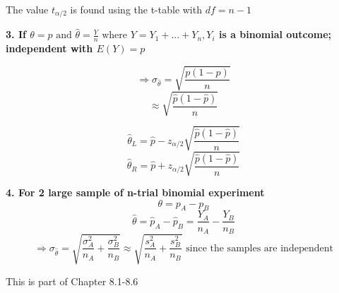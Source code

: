 \documentclass[12pt, letterpaper]{article}
\begin{document}
The value $t_{\alpha/2}$ is found using the t-table with $df=n-1$\bigskip

\textbf{3. If $\theta=p \text{ and } \hat{\theta}=\frac{Y}{n} \text{ where } Y=Y_1+...+Y_n, Y_i$ is a binomial outcome; independent with $E(Y)=p$}

$$\Rightarrow\sigma_{\hat{\theta}} = \sqrt{\frac{p(1-p)}{n}}$$
$$\approx\sqrt{\frac{\hat{p}(1-\hat{p})}{n}}$$

$$\hat{\theta}_L=\hat{p}-z_{\alpha/2}\sqrt{\frac{\hat{p}(1-\hat{p})}{n}}$$
$$\hat{\theta}_R=\hat{p}+z_{\alpha/2}\sqrt{\frac{\hat{p}(1-\hat{p})}{n}}$$

\textbf{4. For 2 large sample of n-trial binomial experiment}
$$\theta=p_A-p_B$$
$$\hat{\theta} = \hat{p}_A - \hat{p}_B= \frac{Y_A}{n_A}-\frac{Y_B}{n_B}$$
$$\Rightarrow \sigma_{\hat{\theta}}=\sqrt{\frac{\sigma_A^2}{n_A}+\frac{\sigma_B^2}{n_B}} \approx \sqrt{\frac{s_A^2}{n_A}+\frac{s_B^2}{n_B}} \text{ since the samples are independent}$$

This is part of Chapter 8.1-8.6








\end{document}
